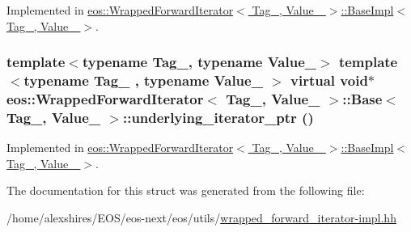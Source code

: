 Implemented in \hyperlink{structeos_1_1WrappedForwardIterator_1_1BaseImpl_aae9d385a45b3ddddab20aec8e9f49fe8}{eos::WrappedForwardIterator$<$ Tag\_\-, Value\_\- $>$::BaseImpl$<$ Tag\_\-, Value\_\- $>$}.\hypertarget{structeos_1_1WrappedForwardIterator_1_1Base_a6f51dc38ebf16d338c4d14421a3a98e1}{
\subsubsection[{underlying\_\-iterator\_\-ptr}]{\setlength{\rightskip}{0pt plus 5cm}template$<$typename Tag\_\-, typename Value\_\-$>$ template$<$typename Tag\_\- , typename Value\_\- $>$ virtual void$\ast$ {\bf eos::WrappedForwardIterator}$<$ Tag\_\-, Value\_\- $>$::{\bf Base}$<$ Tag\_\-, Value\_\- $>$::underlying\_\-iterator\_\-ptr ()}}
\label{structeos_1_1WrappedForwardIterator_1_1Base_a6f51dc38ebf16d338c4d14421a3a98e1}


Implemented in \hyperlink{structeos_1_1WrappedForwardIterator_1_1BaseImpl_aab9c324066b8488f0f84395de5b02dfc}{eos::WrappedForwardIterator$<$ Tag\_\-, Value\_\- $>$::BaseImpl$<$ Tag\_\-, Value\_\- $>$}.

The documentation for this struct was generated from the following file:\begin{DoxyCompactItemize}
\item 
/home/alexshires/EOS/eos-\/next/eos/utils/\hyperlink{wrapped__forward__iterator-impl_8hh}{wrapped\_\-forward\_\-iterator-\/impl.hh}\end{DoxyCompactItemize}

